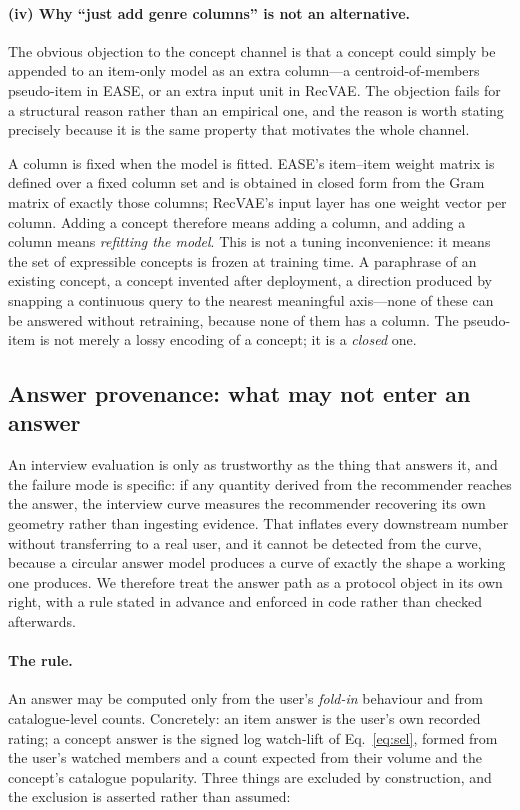 \documentclass[11pt]{article}
\begin{document}
\paragraph{(iv) Why ``just add genre columns'' is not an alternative.}
The obvious objection to the concept channel is that a concept could simply be appended to an item-only model as an
extra column---a centroid-of-members pseudo-item in EASE, or an extra input unit in RecVAE. The objection fails for a
structural reason rather than an empirical one, and the reason is worth stating precisely because it is the same
property that motivates the whole channel.

A column is fixed when the model is fitted. EASE's item--item weight matrix is defined over a fixed column set and is
obtained in closed form from the Gram matrix of exactly those columns; RecVAE's input layer has one weight vector per
column. Adding a concept therefore means adding a column, and adding a column means \emph{refitting the model}. This
is not a tuning inconvenience: it means the set of expressible concepts is frozen at training time. A paraphrase of an
existing concept, a concept invented after deployment, a direction produced by snapping a continuous query to the
nearest meaningful axis---none of these can be answered without retraining, because none of them has a column. The
pseudo-item is not merely a lossy encoding of a concept; it is a \emph{closed} one.

\subsection{Answer provenance: what may not enter an answer}\label{sec:firewall}

An interview evaluation is only as trustworthy as the thing that answers it, and the failure mode is specific: if
any quantity derived from the recommender reaches the answer, the interview curve measures the recommender
recovering its own geometry rather than ingesting evidence. That inflates every downstream number without
transferring to a real user, and it cannot be detected from the curve, because a circular answer model produces a
curve of exactly the shape a working one produces. We therefore treat the answer path as a protocol object in its
own right, with a rule stated in advance and enforced in code rather than checked afterwards.

\paragraph{The rule.} An answer may be computed only from the user's \emph{fold-in} behaviour and from
catalogue-level counts. Concretely: an item answer is the user's own recorded rating; a concept answer is the
signed log watch-lift of Eq.~\eqref{eq:sel}, formed from the user's watched members and a count expected from
their volume and the concept's catalogue popularity. Three things are excluded by construction, and the exclusion
is asserted rather than assumed:
\end{document}
